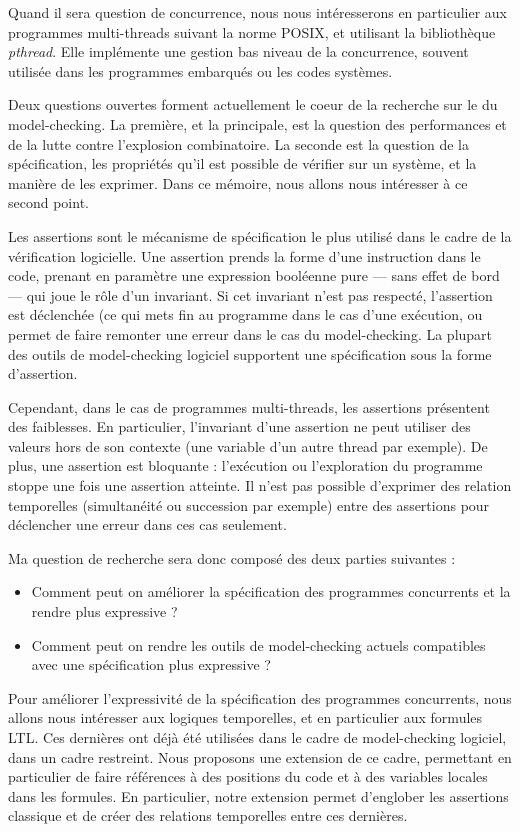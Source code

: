 Quand il sera question de concurrence, nous nous intéresserons en
particulier aux programmes multi-threads suivant la norme POSIX, et
utilisant la bibliothèque \emph{pthread}. Elle implémente une gestion
bas niveau de la concurrence, souvent utilisée dans les programmes
embarqués ou les codes systèmes.

Deux questions ouvertes forment actuellement le coeur de la recherche
sur le du model-checking. La première, et la principale, est la question
des performances et de la lutte contre l'explosion combinatoire. La
seconde est la question de la spécification, les propriétés qu'il est
possible de vérifier sur un système, et la manière de les exprimer. Dans
ce mémoire, nous allons nous intéresser à ce second point.

Les assertions sont le mécanisme de spécification le plus utilisé dans
le cadre de la vérification logicielle. Une assertion prends la forme
d'une instruction dans le code, prenant en paramètre une expression
booléenne pure --- sans effet de bord --- qui joue le rôle d'un
invariant. Si cet invariant n'est pas respecté, l'assertion est
déclenchée (ce qui mets fin au programme dans le cas d'une exécution, ou
permet de faire remonter une erreur dans le cas du model-checking. La
plupart des outils de model-checking logiciel supportent une
spécification sous la forme d'assertion.

Cependant, dans le cas de programmes multi-threads, les assertions
présentent des faiblesses. En particulier, l'invariant d'une assertion
ne peut utiliser des valeurs hors de son contexte (une variable d'un
autre thread par exemple). De plus, une assertion est bloquante :
l'exécution ou l'exploration du programme stoppe une fois une assertion
atteinte. Il n'est pas possible d'exprimer des relation temporelles
(simultanéité ou succession par exemple) entre des assertions pour
déclencher une erreur dans ces cas seulement.

Ma question de recherche sera donc composé des deux parties suivantes :

\begin{itemize}
\item
  Comment peut on améliorer la spécification des programmes concurrents
  et la rendre plus expressive ?
\item
  Comment peut on rendre les outils de model-checking actuels
  compatibles avec une spécification plus expressive ?
\end{itemize}

Pour améliorer l'expressivité de la spécification des programmes
concurrents, nous allons nous intéresser aux logiques temporelles, et en
particulier aux formules \ac{LTL}. Ces dernières ont déjà été utilisées dans
le cadre de model-checking logiciel, dans un cadre restreint. Nous
proposons une extension de ce cadre, permettant en particulier de faire
références à des positions du code et à des variables locales dans les
formules. En particulier, notre extension permet d'englober les
assertions classique et de créer des relations temporelles entre ces
dernières.

